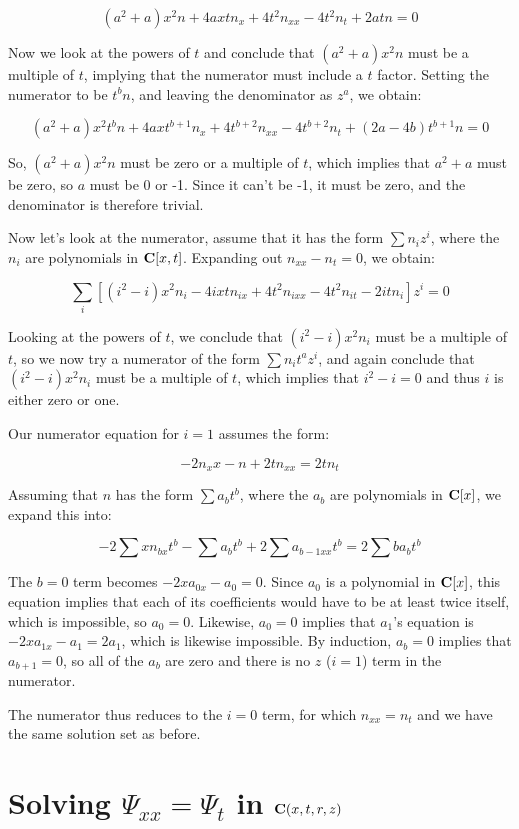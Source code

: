 \documentclass{article}
\newcommand{\C}{\ensuremath{{\bf C}}}
\begin{document}
$$(a^{2} +a)x^{2}n +4axtn_x +4t^{2}n_{xx} -4t^{2}n_t +2atn = 0$$

Now we look at the powers of $t$ and conclude that $(a^{2}
+a)x^{2}n$ must be a multiple of $t$, implying that the numerator
must include a $t$ factor.  Setting the numerator to be $t^b n$, and
leaving the denominator as $z^a$, we obtain:

$$(a^{2} +a)x^{2}t^{b}n +4axt^{b +1}n_x +4t^{b +2}n_{xx} -4t^{b +2}n_t +(2a -4b)t^{b +1}n = 0$$

So, $(a^{2} +a)x^{2}n$ must be zero or a multiple of $t$, which implies that $a^2+a$ must be
zero, so $a$ must be 0 or -1.  Since it can't be -1, it must be zero,
and the denominator is therefore trivial.

Now let's look at the numerator, assume that it has the form $\sum n_i z^i$, where the $n_i$
are polynomials in $\C[x,t]$.  Expanding out $n_{xx} - n_t = 0$, we obtain:

$$\sum_i \left[ (i^{2} -i)x^{2}n_i -4ixtn_{ix} +4t^{2}n_{ixx} -4t^{2}n_{it} -2itn_i \right] z^i = 0$$

Looking at the powers of $t$, we conclude that $(i^{2} -i)x^{2}n_i$ must be a multiple
of $t$, so we now try a numerator of the form $\sum n_i t^a z^i$, and again
conclude that $(i^2-i) x^2 n_i$ must be a multiple of $t$, which implies that $i^2-i=0$
and thus $i$ is either zero or one.

Our numerator equation for $i=1$ assumes the form:

$$-2n_x x - n + 2 t n_{xx} = 2 t n_t$$

Assuming that $n$ has the form $\sum a_b t^b$, where the $a_b$ are polynomials in
$\C[x]$, we expand this into:

$$-2\sum x n_{bx} t^b - \sum a_b t^b + 2 \sum a_{b-1xx} t^{b} = 2 \sum b a_b t^b$$

The $b=0$ term becomes $-2xa_{0x} - a_0 = 0$.  Since $a_0$ is a polynomial
in $\C[x]$, this equation implies that each of its coefficients would have
to be at least twice itself, which is impossible, so $a_0=0$.  Likewise,
$a_0=0$ implies that $a_1$'s equation is $-2xa_{1x}-a_1=2a_1$, which is
likewise impossible.  By induction, $a_b=0$ implies that $a_{b+1}=0$,
so all of the $a_b$ are zero and there is no $z$ ($i=1$) term in
the numerator.

The numerator thus reduces to the $i=0$ term, for which $n_{xx}=n_t$
and we have the same solution set as before.

\vfill\eject
\section*{Solving $\Psi_{xx}=\Psi_t$ in $\C(x,t,r,z)$}
\end{document}
